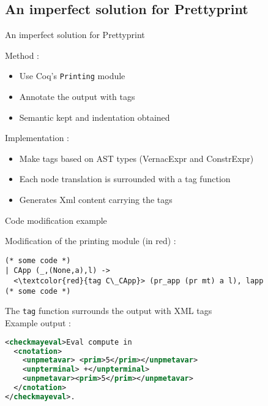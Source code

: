 \documentclass[compress]{beamer}
\newenvironment{tframe}[1]{
  \subsection{#1}
  \begin{frame}{#1}
  }{
  \end{frame}
  }
\begin{document}
  \begin{tframe}{An imperfect solution for Prettyprint}

    Method :
    \begin{itemize}
      \item Use Coq's \texttt{Printing} module
      \item Annotate the output with tags
      \item Semantic kept and indentation obtained
    \end{itemize}
    Implementation :
    \begin{itemize}
      \item Make tags based on AST types (VernacExpr and ConstrExpr)
      \item Each node translation is surrounded with a tag function
      \item Generates Xml content carrying the tags
    \end{itemize}
  \end{tframe}

  \begin{frame}[containsverbatim]{Code modification example}

    Modification of the printing module (in red) :
    \begin{lstlisting}[escapeinside=\<\>]
(* some code *)
| CApp (_,(None,a),l) ->
  <\textcolor{red}{tag C\_CApp}> (pr_app (pr mt) a l), lapp
(* some code *)
    \end{lstlisting}

    The \texttt{tag} function surrounds the output with XML tags \\
    Example output :
    \begin{lstlisting}[language=xml]
<checkmayeval>Eval compute in
  <cnotation>
    <unpmetavar> <prim>5</prim></unpmetavar>
    <unpterminal> +</unpterminal>
    <unpmetavar><prim>5</prim></unpmetavar>
  </cnotation>
</checkmayeval>.
\end{lstlisting}
  \end{frame}
\end{document}

